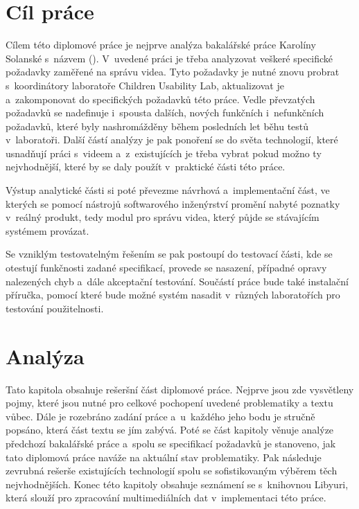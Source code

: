 \documentclass[thesis=M,czech]{FITthesis}[2012/06/26]
\begin{document}
\chapter{Cíl práce}
Cílem této diplomové práce je nejprve analýza bakalářské práce Karolíny Solanské s~názvem  (\cite{solankar}). V~uvedené práci je třeba analyzovat veškeré specifické požadavky zaměřené na správu videa. Tyto požadavky je nutné znovu probrat s~koordinátory  laboratoře Children Usability Lab, aktualizovat je a~zakomponovat do specifických požadavků této práce. Vedle převzatých požadavků se nadefinuje i~spousta dalších, nových funkčních i~nefunkčních požadavků, které byly nashromážděny během posledních let běhu testů v~laboratoři. Další částí analýzy je pak ponoření se do světa technologií, které usnadňují práci s~videem a~z~existujících je třeba vybrat pokud možno ty nejvhodnější, které by se daly použít v~praktické části této práce.
	
	Výstup analytické části si poté převezme návrhová a~implementační část, ve kterých se pomocí nástrojů softwarového inženýrství promění nabyté poznatky v~reálný produkt, tedy modul pro správu videa, který půjde se stávajícím systémem provázat.
	
	Se vzniklým testovatelným řešením se pak postoupí do testovací části, kde se otestují funkčnosti zadané specifikací, provede se nasazení, případné opravy nalezených chyb a~dále akceptační testování.
Součástí práce bude také instalační příručka, pomocí které bude možné systém nasadit v~různých laboratořích pro testování použitelnosti.

\chapter{Analýza}
Tato kapitola obsahuje rešeršní část diplomové práce. Nejprve jsou zde vysvětleny pojmy, které jsou nutné pro celkové pochopení uvedené problematiky a textu vůbec. Dále je rozebráno zadání práce a~u~každého jeho bodu je stručně popsáno, která část textu se jím zabývá. Poté se část kapitoly věnuje analýze předchozí bakalářské práce a~spolu se specifikací požadavků je stanoveno, jak tato diplomová práce naváže na aktuální stav problematiky. Pak následuje zevrubná rešerše existujících technologií spolu se sofistikovaným výběrem těch nejvhodnějších. Konec této kapitoly obsahuje seznámení se s~knihovnou Libyuri, která slouží pro zpracování multimediálních dat v~implementaci této práce.
\end{document}
